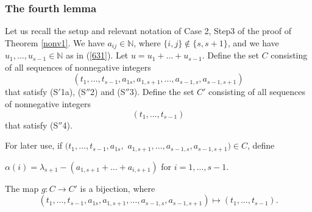 \documentclass[ALCO,Unicode]{cedram}
\numberwithin{equation}{section}
\begin{document}
		\subsubsection{The fourth lemma}Let us recall the setup and relevant notation of Case 2, Step3 of the proof of Theorem \ref{nonv1}. We have $a_{ij} \in \mathbb{N}$, where $\{i,j\} \notin \{s,s+1\}$, and we have $u_1,\dots,u_{s-1} \in \mathbb{N}$ as in (\ref{631}). Let $u=u_1+\dots+u_{s-1}$. Define the set $C$ consisting of all sequences of nonnegative integers \[(t_1,\dots,t_{s-1},a_{1s}, a_{1,s+1},\dots,a_{s-1,s}, a_{s-1,s+1})\] that satisfy (S$'$1a), (S$''$2) and (S$''$3).  Define the set $C'$ consisting of all sequences of nonnegative integers \[(t_1,\dots,t_{s-1})\] that satisfy (S$''$4). 
	
	For later use, if $(t_1,\dots,t_{s-1},a_{1s},$ $a_{1,s+1},\dots,a_{s-1,s}, a_{s-1,s+1}) \in C$, define \begin{center}
		$\alpha(i)=\lambda_{s+1}-(a_{1,s+1}+\dots+a_{i,s+1})$  for $i=1,\dots,s-1$.
	\end{center}
	\begin{lemma}\label{lemma4}
		The map $g:C \to C'$ is a bijection, where \[(t_1,\dots,t_{s-1},a_{1s}, a_{1,s+1},\dots,a_{s-1,s}, a_{s-1,s+1}) \mapsto (t_1,\dots,t_{s-1}).\]
	\end{lemma}
\end{document}
